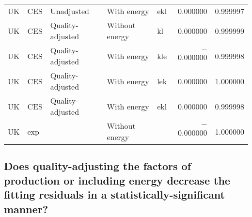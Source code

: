 \documentclass[preprint,authoryear,12pt]{elsarticle}\usepackage[]{graphicx}\usepackage[]{color}
\begin{document}
\begin{table}[ht]
{\begin{tabular}{lllllrr}
  UK & CES & Unadjusted & With energy & ekl & 0.000000 & 0.999997 \\ 
  UK & CES & Quality-adjusted & Without energy & kl & 0.000000 & 0.999999 \\ 
  UK & CES & Quality-adjusted & With energy & kle & $-$0.000000 & 0.999998 \\ 
  UK & CES & Quality-adjusted & With energy & lek & 0.000000 & 1.000000 \\ 
  UK & CES & Quality-adjusted & With energy & ekl & 0.000000 & 0.999998 \\ 
  UK & exp &  & Without energy &  & $-$0.000000 & 1.000000 \\ 
   \hline
\end{tabular}
}
\end{table}



\subsection{Does quality-adjusting the factors of production or including energy
            decrease the fitting residuals in a statistically-significant manner?} 
\label{sec:quality_adj_energy_and_fitting_residual}
\end{document}
